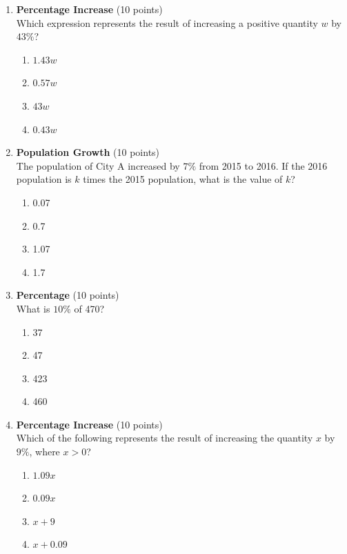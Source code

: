 \begin{enumerate}
  \item \textbf{Percentage Increase} (10 points)\\
  Which expression represents the result of increasing a positive quantity $w$ by $43\%$?
  \begin{enumerate}[label=(\Alph*)]
    \item $1.43w$
    \item $0.57w$
    \item $43w$
    \item $0.43w$
  \end{enumerate}
  \begin{subanswer}
  \end{subanswer}

  \item \textbf{Population Growth} (10 points)\\
  The population of City A increased by $7\%$ from 2015 to 2016. If the 2016 population is $k$ times the 2015 population, what is the value of $k$?
  \begin{enumerate}[label=(\Alph*)]
    \item 0.07
    \item 0.7
    \item 1.07
    \item 1.7
  \end{enumerate}
  \begin{subanswer}
  \end{subanswer}

  \item \textbf{Percentage} (10 points)\\
  What is $10\%$ of 470?
  \begin{enumerate}[label=(\Alph*)]
    \item 37
    \item 47
    \item 423
    \item 460
  \end{enumerate}
  \begin{subanswer}
  \end{subanswer}

  \item \textbf{Percentage Increase} (10 points)\\
  Which of the following represents the result of increasing the quantity $x$ by $9\%$, where $x>0$?
  \begin{enumerate}[label=(\Alph*)]
    \item $1.09x$
    \item $0.09x$
    \item $x+9$
    \item $x+0.09$
  \end{enumerate}
  \begin{subanswer}
  \end{subanswer}


\end{enumerate}
